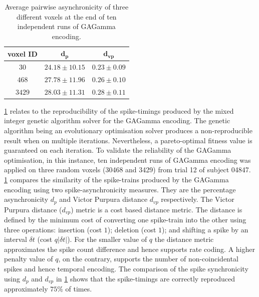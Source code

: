 \begin{table}
\centering
\caption{Average pairwise asynchronicity of three different voxels at the end of ten independent runs of GAGamma encoding.}
\label{tab:dist}
\begin{tabular}{@{}ccc@{}}
\toprule
\textbf{voxel ID} & $\mathbf{d_p}$ & $\mathbf{d_{vp}}$ \\ \midrule
$30$ & $24.18\pm 10.15$ & $0.23\pm 0.09$ \\
$468$ & $27.78\pm 11.96$ & $0.26\pm 0.10$ \\
$3429$ & $28.03\pm 11.31$ & $0.28\pm 0.11$ \\ \bottomrule
\end{tabular}
\end{table}

\tablename \ref{tab:dist} relates to the reproducibility of the spike-timings produced by the mixed integer genetic algorithm solver for the GAGamma encoding. The genetic algorithm being an evolutionary optimisation solver produces a non-reproducible result when on multiple iterations. Nevertheless, a pareto-optimal fitness value is guaranteed on each iteration. To validate the reliability of the GAGamma optimisation, in this instance, ten independent runs of GAGamma encoding was applied on three random voxels (30468 and 3429) from trial 12 of subject 04847. \tablename \ref{tab:dist} compares the similarity of the spike-trains produced by the GAGamma encoding using two spike-asynchronicity measures. They are the percentage asynchronicity $d_p$ and Victor Purpura distance $d_{vp}$ respectively. The Victor Purpura distance ($d_{vp}$) \citep{victor1997metric} metric is a cost based distance metric. The distance is defined by the minimum cost of converting one spike-train into the other using three operations: insertion (cost $1$); deletion (cost $1$); and shifting a spike by an interval $\delta t$ (cost $q|\delta t|$). For the smaller value of $q$ the distance metric approximates the spike count difference and hence supports rate coding. A higher penalty value of $q$, on the contrary, supports the number of non-coincidental spikes and hence temporal encoding. The comparison of the spike synchronicity using $d_p$ and $d_{vp}$ in \tablename \ref{tab:dist} shows that the spike-timings are correctly reproduced approximately $75\%$ of times.

